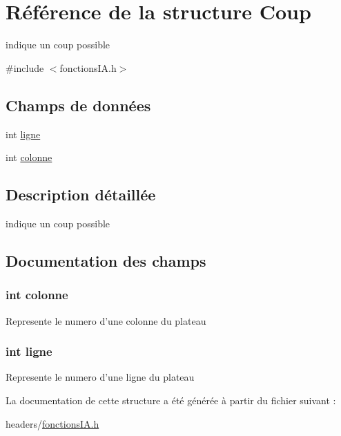 \hypertarget{struct_coup}{\section{\-Référence de la structure \-Coup}
\label{struct_coup}
}


indique un coup possible  




{\ttfamily \#include $<$fonctions\-I\-A.\-h$>$}

\subsection*{\-Champs de données}
\begin{DoxyCompactItemize}
\item 
int \hyperlink{struct_coup_a66af32d3d7b5e0efd6db373c0813e7dd}{ligne}
\item 
int \hyperlink{struct_coup_a733a251be89c7decb13f4fb7b413c82d}{colonne}
\end{DoxyCompactItemize}


\subsection{\-Description détaillée}
indique un coup possible 

\subsection{\-Documentation des champs}
\hypertarget{struct_coup_a733a251be89c7decb13f4fb7b413c82d}{
\subsubsection[{colonne}]{\setlength{\rightskip}{0pt plus 5cm}int {\bf colonne}}}\label{struct_coup_a733a251be89c7decb13f4fb7b413c82d}
\-Represente le numero d'une colonne du plateau \hypertarget{struct_coup_a66af32d3d7b5e0efd6db373c0813e7dd}{
\subsubsection[{ligne}]{\setlength{\rightskip}{0pt plus 5cm}int {\bf ligne}}}\label{struct_coup_a66af32d3d7b5e0efd6db373c0813e7dd}
\-Represente le numero d'une ligne du plateau 

\-La documentation de cette structure a été générée à partir du fichier suivant \-:\begin{DoxyCompactItemize}
\item 
headers/\hyperlink{fonctions_i_a_8h}{fonctions\-I\-A.\-h}\end{DoxyCompactItemize}
